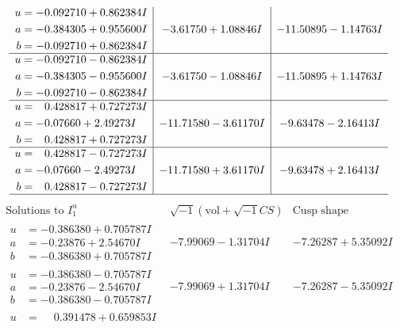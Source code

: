 \documentclass[1p]{elsarticle_modified}
\theoremstyle{definition}
\newcommand{\I}{\sqrt{-1}}
\begin{document}
$$\begin{array}{c|c|c}
\begin{aligned}
u &= -0.092710 + 0.862384 I \\
a &= -0.384305 + 0.955600 I \\
b &= -0.092710 + 0.862384 I\end{aligned}
 & -3.61750 + 1.08846 I & -11.50895 - 1.14763 I \\ \hline\begin{aligned}
u &= -0.092710 - 0.862384 I \\
a &= -0.384305 - 0.955600 I \\
b &= -0.092710 - 0.862384 I\end{aligned}
 & -3.61750 - 1.08846 I & -11.50895 + 1.14763 I \\ \hline\begin{aligned}
u &= \phantom{-}0.428817 + 0.727273 I \\
a &= -0.07660 + 2.49273 I \\
b &= \phantom{-}0.428817 + 0.727273 I\end{aligned}
 & -11.71580 - 3.61170 I & -9.63478 - 2.16413 I \\ \hline\begin{aligned}
u &= \phantom{-}0.428817 - 0.727273 I \\
a &= -0.07660 - 2.49273 I \\
b &= \phantom{-}0.428817 - 0.727273 I\end{aligned}
 & -11.71580 + 3.61170 I & -9.63478 + 2.16413 I\\
 \hline 
 \end{array}$$\newpage$$\begin{array}{c|c|c}  
\text{Solutions to }I^u_{1}& \I (\text{vol} + \sqrt{-1}CS) & \text{Cusp shape}\\
 \hline 
\begin{aligned}
u &= -0.386380 + 0.705787 I \\
a &= -0.23876 + 2.54670 I \\
b &= -0.386380 + 0.705787 I\end{aligned}
 & -7.99069 - 1.31704 I & -7.26287 + 5.35092 I \\ \hline\begin{aligned}
u &= -0.386380 - 0.705787 I \\
a &= -0.23876 - 2.54670 I \\
b &= -0.386380 - 0.705787 I\end{aligned}
 & -7.99069 + 1.31704 I & -7.26287 - 5.35092 I \\ \hline\begin{aligned}
u &= \phantom{-}0.391478 + 0.659853 I \\

\end{aligned}
\end{array}$$
\end{document}
